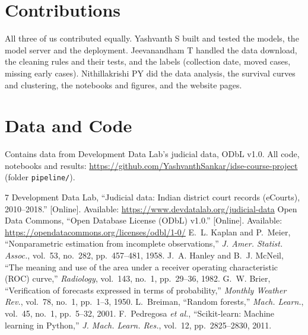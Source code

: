 \documentclass[11pt,a4paper]{article}
\begin{document}
\section*{Contributions}
All three of us contributed equally. Yashvanth S built and tested the models, the model server
and the deployment. Jeevanandham T handled the data download, the cleaning rules and their tests,
and the labels (collection date, moved cases, missing early cases). Nithillakrishi PY did the data
analysis, the survival curves and clustering, the notebooks and figures, and the website pages.

\section*{Data and Code}
Contains data from Development Data Lab's judicial data, ODbL v1.0. All code, notebooks and
results: \url{https://github.com/YashvanthSankar/idse-course-project} (folder \texttt{pipeline/}).

\begin{thebibliography}{7}\small
{} Development Data Lab, ``Judicial data: Indian district court records (eCourts),
2010--2018.'' [Online]. Available: \url{https://www.devdatalab.org/judicial-data}
 Open Data Commons, ``Open Database License (ODbL) v1.0.'' [Online]. Available:
\url{https://opendatacommons.org/licenses/odbl/1-0/}
 E.~L. Kaplan and P.~Meier, ``Nonparametric estimation from incomplete observations,''
\emph{J. Amer. Statist. Assoc.}, vol.~53, no.~282, pp.~457--481, 1958.
 J.~A. Hanley and B.~J. McNeil, ``The meaning and use of the area under a receiver
operating characteristic (ROC) curve,'' \emph{Radiology}, vol.~143, no.~1, pp.~29--36, 1982.
 G.~W. Brier, ``Verification of forecasts expressed in terms of probability,''
\emph{Monthly Weather Rev.}, vol.~78, no.~1, pp.~1--3, 1950.
 L.~Breiman, ``Random forests,'' \emph{Mach. Learn.}, vol.~45, no.~1, pp.~5--32, 2001.
 F.~Pedregosa \emph{et al.}, ``Scikit-learn: Machine learning in Python,''
\emph{J. Mach. Learn. Res.}, vol.~12, pp.~2825--2830, 2011.
\end{thebibliography}
\end{document}
